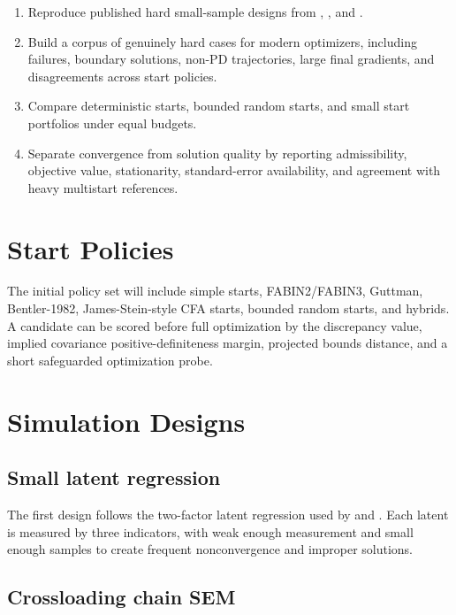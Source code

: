 \documentclass[11pt]{article}
\begin{document}
\begin{enumerate}
\item Reproduce published hard small-sample designs from
  \citet{dejonckere2022bounded}, \citet{dejonckere2025randomstarts}, and
  \citet{ludtke2021pmlmcmc}.
\item Build a corpus of genuinely hard cases for modern optimizers, including
  failures, boundary solutions, non-PD trajectories, large final gradients, and
  disagreements across start policies.
\item Compare deterministic starts, bounded random starts, and small start
  portfolios under equal budgets.
\item Separate convergence from solution quality by reporting admissibility,
  objective value, stationarity, standard-error availability, and agreement
  with heavy multistart references.
\end{enumerate}

\section{Start Policies}

The initial policy set will include simple starts, FABIN2/FABIN3, Guttman,
Bentler-1982, James-Stein-style CFA starts, bounded random starts, and
hybrids. A candidate can be scored before full optimization by the discrepancy
value, implied covariance positive-definiteness margin, projected bounds
distance, and a short safeguarded optimization probe.

\section{Simulation Designs}

\subsection{Small latent regression}

The first design follows the two-factor latent regression used by
\citet{dejonckere2022bounded} and \citet{dejonckere2025randomstarts}. Each
latent is measured by three indicators, with weak enough measurement and small
enough samples to create frequent nonconvergence and improper solutions.

\subsection{Crossloading chain SEM}
\end{document}
